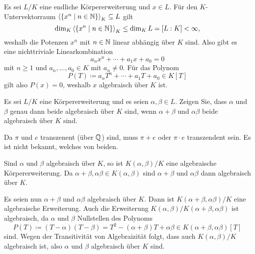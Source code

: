 \begin{solution}
  Es sei $L/K$ eine endliche Körpererweiterung und $x \in L$.
  Für den $K$-Untervektorraum $\left\langle  \{x^n \mid n \in \mathbb{N}\}  \right\rangle_K \subseteq L$ gilt
  \[
          \dim_K \left\langle  \{x^n \mid n \in \mathbb{N} \}  \right\rangle_K
    \leq  \dim_K L
    =     [L : K]
    <     \infty,
  \]
  weshalb die Potenzen $x^n$ mit $n \in \mathbb{N}$ linear abhängig über $K$ sind.
  Also gibt es eine nichttriviale Linearkombination
  \[
    a_n x^n + \dotsb + a_1 x + a_0 = 0
  \]
  mit $n \geq 1$ und $a_n, \dotsc, a_0 \in K$ mit $a_n \neq 0$.
  Für das Polynom
  \[
              P(T)
    \coloneqq a_n T^n + \dotsb + a_1 T + a_0
    \in       K[T]
  \]
  gilt also $P(x) = 0$, weshalb $x$ algebraisch über $K$ ist.
\end{solution}


\begin{question}
  Es sei $L/K$ eine Körpererweiterung und es seien $\alpha, \beta \in L$.
  Zeigen Sie, dass $\alpha$ und $\beta$ genau dann beide algebraisch über $K$ sind, wenn $\alpha + \beta$ und $\alpha \beta$ beide algebraisch über $K$ sind.
\end{question}


\begin{remark*}
  Da $\pi$ und $e$ transzenent (über $\mathbb{Q}$) sind, muss $\pi + e$ oder $\pi \cdot e$ transzendent sein.
  Es ist nicht bekannt, welches von beiden.
\end{remark*}


\begin{solution}
  Sind $\alpha$ und $\beta$ algebraisch über $K$, so ist $K(\alpha, \beta) / K$ eine algebraische Körpererweiterung.
  Da $\alpha + \beta, \alpha \beta \in K(\alpha, \beta)$ sind $\alpha + \beta$ und $\alpha \beta$ dann algebraisch über $K$.
  
  Es seien nun $\alpha + \beta$ und $\alpha \beta$ algebraisch über $K$.
  Dann ist $K(\alpha + \beta, \alpha \beta)/K$ eine algebraische Erweiterung.
  Auch die Erweiterung $K(\alpha, \beta)/K(\alpha + \beta, \alpha \beta)$ ist algebraisch, da $\alpha$ und $\beta$ Nullstellen des Polynoms
  \[
              P(T)
    \coloneqq (T - \alpha)(T - \beta)
    =         T^2 - (\alpha + \beta)T + \alpha \beta
    \in       K(\alpha + \beta, \alpha \beta)[T]
  \]
  sind.
  Wegen der Transitivität von Algebraizität folgt, dass auch $K(\alpha,\beta)/K$ algebraisch ist, also $\alpha$ und $\beta$ algebraisch über $K$ sind.
\end{solution}


